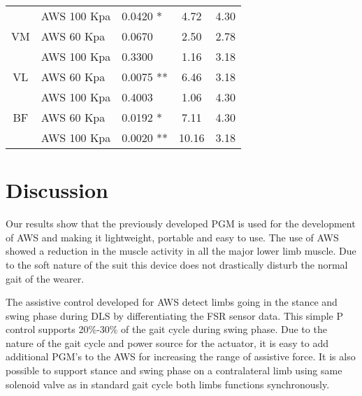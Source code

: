\documentclass[letterpaper, 10 pt, conference]{ieeeconf}  %
\begin{document}
\begin{table}[]
\begin{tabular}{@{}cllcr@{}}
		& AWS 100 Kpa                             & 0.0420 *                                      & 4.72                      & 4.30                                             \\
		VM               & AWS 60 Kpa                              & 0.0670                                        & 2.50                      & 2.78                                             \\
		& AWS 100 Kpa                             & 0.3300                                        & 1.16                      & 3.18                                             \\
		VL               & AWS 60 Kpa                              & 0.0075 **                                     & 6.46                      & 3.18                                             \\
		& AWS 100 Kpa                             & 0.4003                                        & 1.06                      & 4.30                                             \\
		BF               & AWS 60 Kpa                              & 0.0192 *                                      & 7.11                      & 4.30                                             \\
		& AWS 100 Kpa                             & 0.0020 **                                     & 10.16                     & 3.18                                             \\ \bottomrule
	\end{tabular}
\end{table}

\section{Discussion} \label{discuss}

Our results show that the previously developed PGM is used for the development of AWS and making it lightweight, portable and easy to use. The use of AWS showed a reduction in the muscle activity in all the major lower limb muscle. Due to the soft nature of the suit this device does not drastically disturb the normal gait of the wearer. 

The assistive control developed for AWS detect limbs going in the stance and swing phase during DLS by differentiating the FSR sensor data. This simple P control supports 20\%-30\% of the gait cycle during swing phase.  Due to the nature of the gait cycle and power source for the actuator, it is easy to add additional PGM’s to the AWS for increasing the range of assistive force. It is also possible to support stance and swing phase on a contralateral limb using same solenoid valve as in standard gait cycle both limbs functions synchronously.
\end{document}
